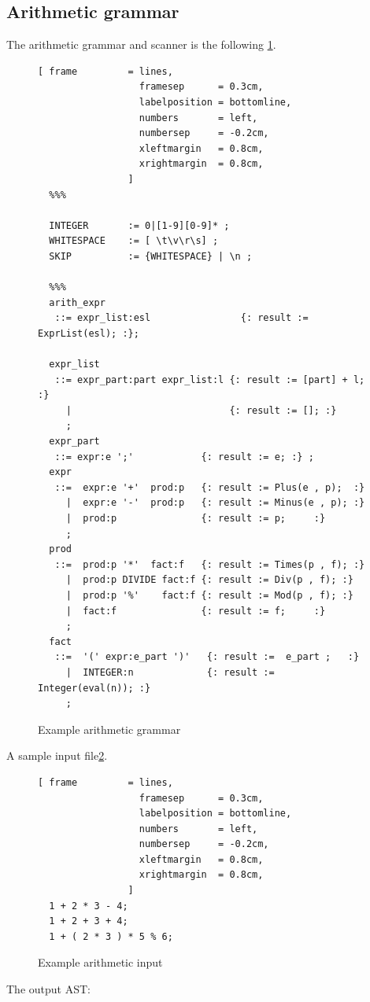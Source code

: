 \subsection{Arithmetic grammar}
The arithmetic grammar and scanner is the following \ref{fig:example_arithmetic_grammer}.
\begin{figure}[!ht]
\begin{Verbatim}[ frame         = lines, 
                  framesep      = 0.3cm, 
                  labelposition = bottomline,
                  numbers       = left,
                  numbersep     = -0.2cm,
                  xleftmargin   = 0.8cm,
                  xrightmargin  = 0.8cm,
                ]
  %%%

  INTEGER       := 0|[1-9][0-9]* ;
  WHITESPACE    := [ \t\v\r\s] ;
  SKIP          := {WHITESPACE} | \n ;

  %%%
  arith_expr 
   ::= expr_list:esl                {: result := ExprList(esl); :};

  expr_list 
   ::= expr_part:part expr_list:l {: result := [part] + l; :} 
     |                            {: result := []; :}
     ;
  expr_part 
   ::= expr:e ';'            {: result := e; :} ;
  expr 
   ::=  expr:e '+'  prod:p   {: result := Plus(e , p);  :} 
     |  expr:e '-'  prod:p   {: result := Minus(e , p); :} 
     |  prod:p               {: result := p;     :}
     ;
  prod 
   ::=  prod:p '*'  fact:f   {: result := Times(p , f); :}
     |  prod:p DIVIDE fact:f {: result := Div(p , f); :} 
     |  prod:p '%'    fact:f {: result := Mod(p , f); :} 
     |  fact:f               {: result := f;     :}
     ;
  fact 
   ::=  '(' expr:e_part ')'   {: result :=  e_part ;   :} 
     |  INTEGER:n             {: result := Integer(eval(n)); :} 
     ;
\end{Verbatim}
\caption{Example arithmetic grammar}
\label{fig:example_arithmetic_grammer}
\end{figure}
%
A sample input file\ref{fig:example_arithmetic_input}.
\begin{figure}[!ht]
\begin{Verbatim}[ frame         = lines, 
                  framesep      = 0.3cm, 
                  labelposition = bottomline,
                  numbers       = left,
                  numbersep     = -0.2cm,
                  xleftmargin   = 0.8cm,
                  xrightmargin  = 0.8cm,
                ]
  1 + 2 * 3 - 4;
  1 + 2 + 3 + 4;
  1 + ( 2 * 3 ) * 5 % 6;
\end{Verbatim}
\caption{Example arithmetic input}
\label{fig:example_arithmetic_input}
\end{figure}
%
The output AST:
%

